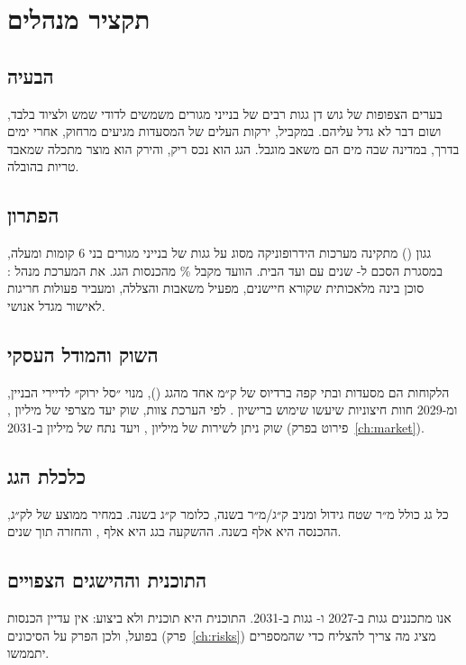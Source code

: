 \chapter{תקציר מנהלים}\label{ch:executive-summary}

\noindent
{}\hfill
{}\hfill
{}

\bigskip

\section*{הבעיה}
בערים הצפופות של גוש דן גגות רבים של בנייני מגורים משמשים לדודי שמש ולציוד בלבד, ושום דבר לא גדל עליהם. במקביל, ירקות העלים של המסעדות מגיעים מרחוק, אחרי ימים בדרך, במדינה שבה מים הם משאב מוגבל. הגג הוא נכס ריק, והירק הוא מוצר מתכלה שמאבד טריות בהובלה.

\section*{הפתרון}
גגון () מתקינה מערכות הידרופוניקה מסוג  על גגות של בנייני מגורים בני 6 קומות ומעלה, במסגרת הסכם ל-\RRcontractYears{} שנים עם ועד הבית. הוועד מקבל \RRrentShare\% מהכנסות הגג. את המערכת מנהל : סוכן בינה מלאכותית שקורא חיישנים, מפעיל משאבות והצללה, ומעביר פעולות חריגות לאישור מגדל אנושי.

\section*{השוק והמודל העסקי}
הלקוחות הם מסעדות ובתי קפה ברדיוס של ק״מ אחד מהגג (), מנוי ״סל ירוק״ לדיירי הבניין, ומ-2029 חוות חיצוניות שיעשו שימוש ברישיון . לפי הערכת צוות, שוק יעד מצרפי של \RRtam{} מיליון \shekel, שוק ניתן לשירות של \RRsam{} מיליון \shekel, ויעד נתח של \RRsom{} מיליון \shekel{} ב-2031 (פירוט בפרק~\ref{ch:market}).

\section*{כלכלת הגג}
כל גג כולל \RRarea{} מ״ר שטח גידול ומניב \RRyield{} ק״ג/מ״ר בשנה, כלומר \RRroofKg{} ק״ג בשנה. במחיר ממוצע של \RRprice{} \shekel{} לק״ג, ההכנסה היא \RRroofRevenue{} אלף \shekel{} בשנה. ההשקעה בגג היא \RRcapexRoof{} אלף \shekel, והחזרה תוך \RRroofPayback{} שנים.

\section*{התוכנית וההישגים הצפויים}
אנו מתכננים \RRroofsFirst{} גגות ב-2027 ו-\RRroofsFinal{} גגות ב-2031. התוכנית היא תוכנית ולא ביצוע: אין עדיין הכנסות בפועל, ולכן הפרק על הסיכונים (פרק~\ref{ch:risks}) מציג מה צריך להצליח כדי שהמספרים יתממשו.

